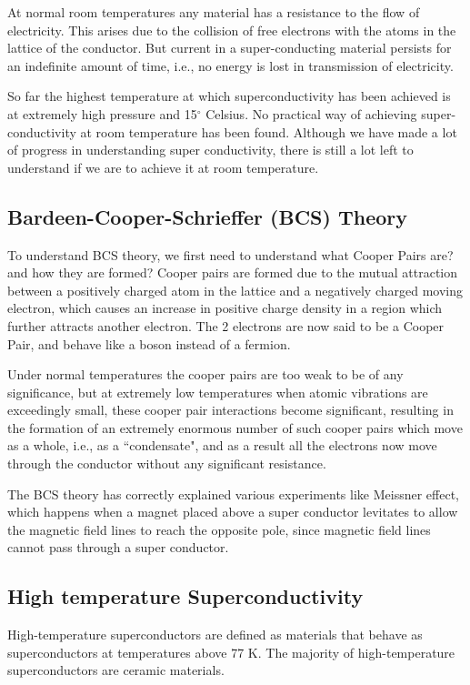 \documentclass{article}
\begin{document}
At normal room temperatures any material has a resistance to the flow of electricity. This arises due to the collision of free electrons with the atoms in the lattice of the conductor. But current in a super-conducting material persists for an indefinite amount of time, i.e., no energy is lost in transmission of electricity.  

So far the highest temperature at which superconductivity has been achieved is at extremely high pressure and 15$^{\circ}$ Celsius. No practical way of achieving super-conductivity at room temperature has been found. Although we have made a lot of progress in understanding super conductivity, there is still a lot left to understand if we are to achieve it at room temperature.  





\subsection{Bardeen-Cooper-Schrieffer (BCS) Theory}

To understand BCS theory, we first need to understand what Cooper Pairs are? and how they are formed? Cooper pairs are formed due to the mutual attraction between a positively charged atom in the lattice and a negatively charged moving electron, which causes an increase in positive charge density in a region which further attracts another electron. The 2 electrons are now said to be a Cooper Pair, and behave like a boson instead of a fermion. \cite{hightempsuper}

Under normal temperatures the cooper pairs are too weak to be of any significance, but at extremely low temperatures when atomic vibrations are exceedingly small, these cooper pair interactions become significant, resulting in the formation of an extremely enormous number of such cooper pairs which move as a whole, i.e., as a “condensate", and as a result all the electrons now move through the conductor without any significant resistance. 

The BCS theory has correctly explained various experiments like Meissner effect, which happens when a magnet placed above a super conductor levitates to allow the magnetic field lines to reach the opposite pole, since magnetic field lines cannot pass through a super conductor. 


\subsection{High temperature Superconductivity}
High-temperature superconductors are defined as materials that behave as superconductors at temperatures above 77 K. The majority of high-temperature superconductors are ceramic materials. 
\end{document}
